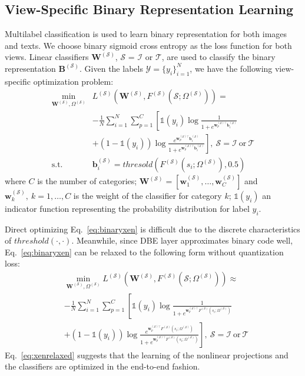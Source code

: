 \documentclass[10pt,twocolumn,letterpaper]{article}
\begin{document}
\subsection{View-Specific Binary Representation Learning}\label{sec:classification}
Multilabel classification is used to learn binary representation for both images and texts. We choose binary sigmoid cross entropy as the loss function for both views. Linear classifiers $\mathbf{W}^{(\mathcal{S})}$, $\mathcal{S}$ = $\mathcal{I}$ or $\mathcal{T}$, are used to classify the binary representation $\mathbf{B}^{(\mathcal{S})}$. Given the labels $\mathcal{Y} = \{y_i\}_{i=1}^N$, we have the following view-specific optimization problem:
\begin{align}\label{eq:binaryxen}
\min_{\mathbf{W}^{(\mathcal{S})},\Omega^{(\mathcal{S})}}& \mathit{L}^{(\mathcal{S})}(\mathbf{W}^{(\mathcal{S})},F^{(\mathcal{S})}(\mathcal{S};\Omega^{(\mathcal{S})}))=\\ \nonumber
 & - \frac{1}{N} \sum_{i=1}^N\sum_{p=1}^C \left[\mathds{1}(y_i)\log\frac{1}{1+e^{\mathbf{w}_p^{(\mathcal{S})\top} \mathbf{b}_i^{(\mathcal{S})}}} \right.\\ \nonumber
 &\left. + (1-\mathds{1}(y_i))\log\frac{e^{\mathbf{w}_p^{(\mathcal{S})\top} \mathbf{b}_i^{(\mathcal{S})}}}{1+e^{\mathbf{w}_p^{(\mathcal{S})\top} \mathbf{b}_i^{(\mathcal{S})}}} \right],\ \mathcal{S} = \mathcal{I}\ \text{or}\ \mathcal{T}\\
 \text{s.t.}\quad & \mathbf{b}_i^{(\mathcal{S})} = thresold(F^{(\mathcal{S})}(s_i;\Omega^{(\mathcal{S})}),0.5)\nonumber
\end{align}
where $C$ is the number of categories; $\mathbf{W}^{(\mathcal{S})}=[\mathbf{w}_1^{(\mathcal{S})}, \ldots, \mathbf{w}_C^{(\mathcal{S})}]$ and $\mathbf{w}_k^{(\mathcal{S})},\ k=1,\ldots,C$ is the weight of the classifier for category $k$; $\mathds{1}(y_i)$ an indicator function representing the probability distribution for label $y_i$.

Direct optimizing Eq.~\ref{eq:binaryxen} is difficult due to the discrete characteristics of $threshold(\cdot,\cdot)$. Meanwhile, since DBE layer approximates binary code well, Eq.~\ref{eq:binaryxen} can be relaxed to the following form without quantization loss:
\begin{align}\label{eq:xenrelaxed}
&\min_{\mathbf{W}^{(\mathcal{S})},\Omega^{(\mathcal{S})}} \mathit{L}^{(\mathcal{S})}(\mathbf{W}^{(\mathcal{S})},F^{(\mathcal{S})}(\mathcal{S};\Omega^{(\mathcal{S})}))\approx\\ \nonumber
& - \frac{1}{N} \sum_{i=1}^N\sum_{p=1}^C \left[\mathds{1}(y_i)\log\frac{1}{1+e^{\mathbf{w}_p^{(\mathcal{S})\top} F^{(\mathcal{S})}(s_i;\Omega^{(\mathcal{S})})}} \right.\\ \nonumber
&\left. + (1-\mathds{1}(y_i))\log\frac{e^{\mathbf{w}_p^{(\mathcal{S})\top} F^{(\mathcal{S})}(s_i;\Omega^{(\mathcal{S})})}}{1+e^{\mathbf{w}_p^{(\mathcal{S})\top} F^{(\mathcal{S})}(s_i;\Omega^{(\mathcal{S})})}} \right],\ \mathcal{S} = \mathcal{I}\ \text{or}\ \mathcal{T}\nonumber
\end{align}
Eq.~\ref{eq:xenrelaxed} suggests that the learning of the nonlinear projections and the classifiers are optimized in the end-to-end fashion.
\end{document}
